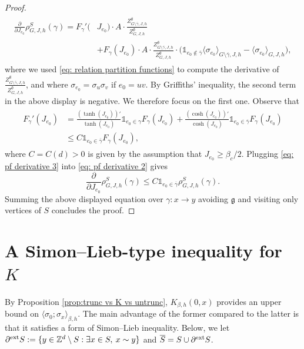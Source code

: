 \documentclass[11pt,a4paper]{article}
\numberwithin{equation}{section}
\theoremstyle{plain}
\theoremstyle{definition}
\begin{document}
\begin{proof}
\begin{align}
\begin{aligned}
	\frac{\partial}{\partial J_{e_0}}\rho_{G,J,h}^S(\gamma)=
	F_\gamma'(&J_{e_0})\cdot A \cdot \frac{Z_{G\setminus \overline{\gamma},J,h}^\emptyset}{Z_{G,J,h}^\emptyset}
	\\&+F_\gamma(J_{e_0})\cdot A \cdot \frac{Z_{G\setminus \overline{\gamma},J,h}^\emptyset}{Z_{G,J,h}^\emptyset}\cdot \Big(\mathds{1}_{e_0\notin\overline{\gamma}}\langle \sigma_{e_0}\rangle_{G\setminus\overline{\gamma},J,h}-\langle \sigma_{e_0}\rangle_{G,J,h}\Big),
	\end{aligned}
\end{align}
where we used \eqref{eq: relation partition functions} to compute the derivative of $\tfrac{Z_{G\setminus \overline{\gamma},J,h}^\emptyset}{Z_{G,J,h}^\emptyset}$, and where $\sigma_{e_0}=\sigma_u\sigma_v$ if $e_0=uv$. By Griffiths' inequality, the second term in the above display is negative. We therefore focus on the first one. Observe that
\begin{align}\label{eq: pf derivative 3}
\begin{aligned}
F_\gamma'(J_{e_0})&=\frac{(\tanh(J_{e_0}))'}{\tanh(J_{e_0})}\mathds{1}_{e_0\in \gamma}F_\gamma(J_{e_0})+\frac{(\cosh(J_{e_0}))'}{\cosh(J_{e_0})}\mathds{1}_{e_0\in \overline{\gamma}}F_\gamma(J_{e_0})
\\&\leq C \mathds{1}_{e_0\in \overline{\gamma}}F_\gamma(J_{e_0}),
\end{aligned}
\end{align}
where $C=C(d)>0$ is given by the assumption that $J_{e_0}\geq \beta_c/2$. Plugging \eqref{eq: pf derivative 3} into \eqref{eq: pf derivative 2} gives
\begin{equation}
	\frac{\partial}{\partial J_{e_0}}\rho_{G,J,h}^S(\gamma)\leq C\mathds{1}_{e_0\in \overline{\gamma}}\rho^S_{G,J,h}(\gamma).
\end{equation}
Summing the above displayed equation over $\gamma:x\rightarrow y$ avoiding $\mathfrak{g}$ and visiting only vertices of $S$ concludes the proof.
\end{proof}




\section{A Simon--Lieb-type inequality for $K$}\label{sec:SL for K}
By Proposition \ref{prop:trunc vs K vs untrunc}, $K_{\beta,h}(0,x)$ provides an upper bound on $\langle\sigma_0;\sigma_x\rangle_{\beta,h}$. The main advantage of the former compared to the latter is that it satisfies a form of Simon--Lieb inequality. Below, we let $\partial^{\textup{ext}}S:=\{y\in \mathbb Z^d\setminus S: \exists x\in S, \: x\sim y\}$ and $\overline{S}=S\cup \partial^{\textup{ext}}S$.
\end{document}
